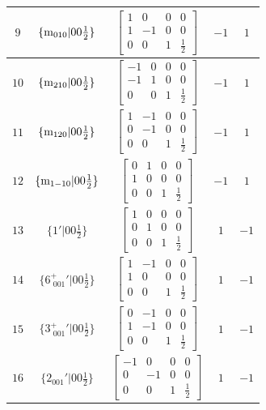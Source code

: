 \documentclass[fleqn,8pt]{jsarticle}
\begin{document}
\begin{longtable}{ccccc}
$ 9 $ & $ \{{\rm m}_{010}|0 0 \frac{1}{2}\} $ & $ \begin{bmatrix} 1 & 0 & 0 & 0 \\ 1 & -1 & 0 & 0 \\ 0 & 0 & 1 & \frac{1}{2} \end{bmatrix} $ & $ -1 $ & $ 1 $ \\ \hline
$ 10 $ & $ \{{\rm m}_{210}|0 0 \frac{1}{2}\} $ & $ \begin{bmatrix} -1 & 0 & 0 & 0 \\ -1 & 1 & 0 & 0 \\ 0 & 0 & 1 & \frac{1}{2} \end{bmatrix} $ & $ -1 $ & $ 1 $ \\ \hline
$ 11 $ & $ \{{\rm m}_{120}|0 0 \frac{1}{2}\} $ & $ \begin{bmatrix} 1 & -1 & 0 & 0 \\ 0 & -1 & 0 & 0 \\ 0 & 0 & 1 & \frac{1}{2} \end{bmatrix} $ & $ -1 $ & $ 1 $ \\ \hline
$ 12 $ & $ \{{\rm m}_{1-10}|0 0 \frac{1}{2}\} $ & $ \begin{bmatrix} 0 & 1 & 0 & 0 \\ 1 & 0 & 0 & 0 \\ 0 & 0 & 1 & \frac{1}{2} \end{bmatrix} $ & $ -1 $ & $ 1 $ \\ \hline
$ 13 $ & $ \{1{}'|0 0 \frac{1}{2}\} $ & $ \begin{bmatrix} 1 & 0 & 0 & 0 \\ 0 & 1 & 0 & 0 \\ 0 & 0 & 1 & \frac{1}{2} \end{bmatrix} $ & $ 1 $ & $ -1 $ \\ \hline
$ 14 $ & $ \{6^{+}_{\,\,001}{}'|0 0 \frac{1}{2}\} $ & $ \begin{bmatrix} 1 & -1 & 0 & 0 \\ 1 & 0 & 0 & 0 \\ 0 & 0 & 1 & \frac{1}{2} \end{bmatrix} $ & $ 1 $ & $ -1 $ \\ \hline
$ 15 $ & $ \{3^{+}_{\,\,001}{}'|0 0 \frac{1}{2}\} $ & $ \begin{bmatrix} 0 & -1 & 0 & 0 \\ 1 & -1 & 0 & 0 \\ 0 & 0 & 1 & \frac{1}{2} \end{bmatrix} $ & $ 1 $ & $ -1 $ \\ \hline
$ 16 $ & $ \{2{}_{001}{}'|0 0 \frac{1}{2}\} $ & $ \begin{bmatrix} -1 & 0 & 0 & 0 \\ 0 & -1 & 0 & 0 \\ 0 & 0 & 1 & \frac{1}{2} \end{bmatrix} $ & $ 1 $ & $ -1 $ \\ \hline

\end{longtable}
\end{document}
